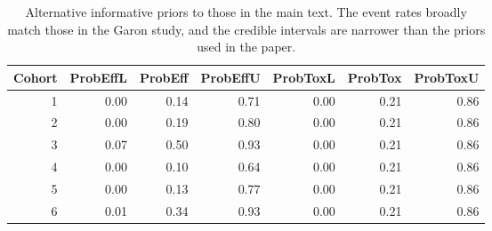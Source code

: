 \documentclass{article}
\begin{document}
\begin{table}[h]
	\centering
	\begin{tabular}{rrrrrrr}
		Cohort & ProbEffL & ProbEff & ProbEffU & ProbToxL & ProbTox & ProbToxU \\ 
		\hline
		1 & 0.00 & 0.14 & 0.71 & 0.00 & 0.21 & 0.86 \\ 
		2 & 0.00 & 0.19 & 0.80 & 0.00 & 0.21 & 0.86 \\ 
		3 & 0.07 & 0.50 & 0.93 & 0.00 & 0.21 & 0.86 \\ 
		4 & 0.00 & 0.10 & 0.64 & 0.00 & 0.21 & 0.86 \\ 
		5 & 0.00 & 0.13 & 0.77 & 0.00 & 0.21 & 0.86 \\ 
		6 & 0.01 & 0.34 & 0.93 & 0.00 & 0.21 & 0.86 \\ 
	\end{tabular}
	\caption{Alternative informative priors to those in the main text. The event rates broadly match those in the Garon study, and the credible intervals are narrower than the priors used in the paper.} 
	\label{tab:inf_priors}
\end{table}
\end{document}
